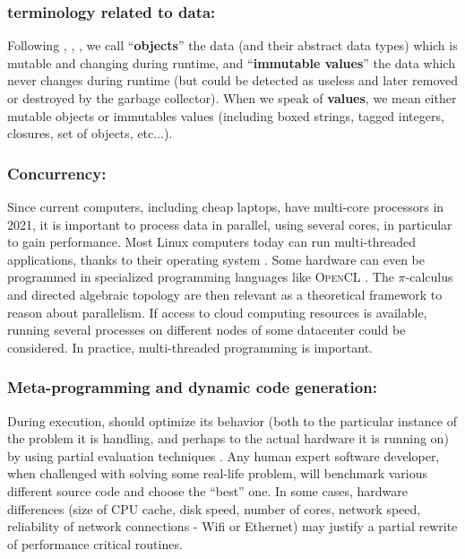 \documentclass{svproc}
\begin{document}
\subsubsection{terminology related to data:} Following \cite{abadi:2012:theory-objects},
\cite{hindley:2008:lambda}, \cite{queinnec:2003:lisp}, we call
``\textbf{objects}'' the data (and their abstract data types) which is
mutable and changing during runtime, and ``\textbf{immutable values}''
the data which never changes during runtime (but could be detected as
useless and later removed or destroyed by the garbage collector). When
we speak of \textbf{\RefPerSys{} values}, we mean either mutable
objects or immutables values (including boxed strings, tagged
integers, closures, set of objects, etc...).

\subsubsection{Concurrency:}
Since current computers, including cheap laptops, have multi-core
processors in 2021, it is important to process data in parallel, using
several cores, in particular to gain performance. Most Linux computers
today can run multi-threaded applications, thanks to their operating
system \cite{Arpaci-Dusseau:2018:OSBook}. Some hardware can even be
programmed in specialized programming languages like \textsc{OpenCL}
\cite{kaeli:2015:heterogeneous-opencl}. The $\pi$-calculus
\cite{sangiorgi:2003:pi-calculus} and directed algebraic topology
\cite{fajstrup:2016:directed} are then relevant as a theoretical
framework to reason about parallelism. If access to cloud computing
resources is available, running several \RefPerSys{} processes on
different nodes of some datacenter could be considered. In practice,
multi-threaded programming \cite{butenhof:1997:programming} is
important.

\subsubsection{Meta-programming and dynamic code generation:}
During execution, \RefPerSys{} should optimize its behavior (both to
the particular instance of the problem it is handling, and perhaps to
the actual hardware it is running on) by using partial evaluation
techniques \cite{futamura:1999:partial-evaluation}. Any human expert
software developer, when challenged with solving some real-life
problem, will benchmark various different source code and choose the
``best'' one. In some cases, hardware differences (size of CPU cache,
disk speed, number of cores, network speed, reliability of network
connections - Wifi or Ethernet) may justify a partial rewrite of
performance critical routines.
\end{document}
